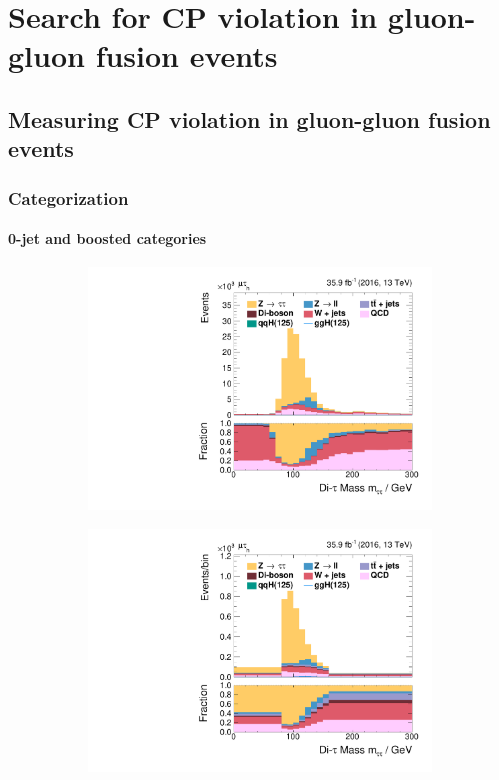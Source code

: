 \chapter{Search for CP violation in gluon-gluon fusion events}
\section{Measuring CP violation in gluon-gluon fusion events}%
\subsection{Categorization}%
\subsubsection{0-jet and boosted categories}%
\begin{figure}[h!]
    \centering
    \begin{subfigure}{.3\textwidth}
        \centering
        \includegraphics[width=\textwidth]{Figures/eventselection/mt/ZeroJetCP/m_sv.pdf}
    \end{subfigure}%
    \begin{subfigure}{.3\textwidth}
        \centering
        \includegraphics[width=\textwidth]{Figures/eventselection/mt/BoostedCP/m_sv.pdf}

\end{subfigure}
\end{figure}
